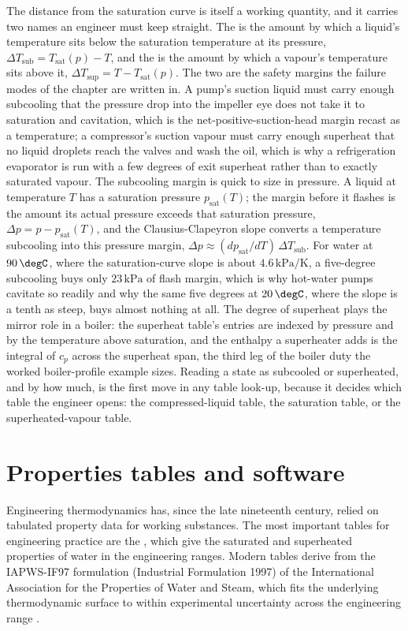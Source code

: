 The distance from the saturation curve is itself a working quantity, and it
carries two names an engineer must keep straight. The  is the amount by which a liquid's temperature sits below the
saturation temperature at its pressure, $\Delta T_{\text{sub}} =
T_{\text{sat}}(p) - T$, and the  is the amount by
which a vapour's temperature sits above it, $\Delta T_{\text{sup}} = T -
T_{\text{sat}}(p)$. The two are the safety margins the failure modes of the
chapter are written in. A pump's suction liquid must carry enough subcooling
that the pressure drop into the impeller eye does not take it to saturation and
cavitation, which is the net-positive-suction-head margin recast as a
temperature; a compressor's suction vapour must carry enough superheat that no
liquid droplets reach the valves and wash the oil, which is why a refrigeration
evaporator is run with a few degrees of exit superheat rather than to exactly
saturated vapour. The subcooling margin is quick to size in pressure. A liquid
at temperature $T$ has a saturation pressure $p_{\text{sat}}(T)$; the margin
before it flashes is the amount its actual pressure exceeds that saturation
pressure, $\Delta p = p - p_{\text{sat}}(T)$, and the Clausius-Clapeyron slope
converts a temperature subcooling into this pressure margin, $\Delta p \approx
(dp_{\text{sat}}/dT)\,\Delta T_{\text{sub}}$. For water at $90\,\degC$, where
the saturation-curve slope is about $4.6\,\text{kPa}/\si{\kelvin}$, a five-degree
subcooling buys only $23\,\text{kPa}$ of flash margin, which is why hot-water
pumps cavitate so readily and why the same five degrees at $20\,\degC$, where
the slope is a tenth as steep, buys almost nothing at all. The degree of
superheat plays the mirror role in a boiler: the superheat table's entries are
indexed by pressure and by the temperature above saturation, and the enthalpy a
superheater adds is the integral of $c_p$ across the superheat span, the third
leg of the boiler duty the worked boiler-profile example sizes. Reading a state
as subcooled or superheated, and by how much, is the first move in any table
look-up, because it decides which table the engineer opens: the compressed-liquid
table, the saturation table, or the superheated-vapour table.

\section{Properties tables and software}

Engineering thermodynamics has, since the late nineteenth century,
relied on tabulated property data for working substances. The most
important tables for engineering practice are the , which give the saturated and superheated properties of water
in the engineering ranges. Modern tables derive from the IAPWS-IF97
formulation (Industrial Formulation 1997) of the International
Association for the Properties of Water and Steam, which fits the
underlying thermodynamic surface to within experimental uncertainty
across the engineering range \cite{text:cengel-boles}.

